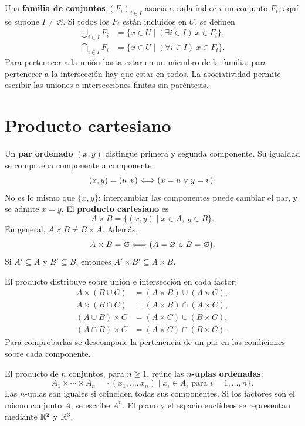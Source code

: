 Una \textbf{familia de conjuntos} $(F_i)_{i\in I}$ asocia a cada índice
$i$ un conjunto $F_i$; aquí se supone $I\ne\varnothing$.
Si todos los $F_i$ están incluidos en $U$, se definen
\begin{align*}
 \bigcup_{i\in I}F_i
   &=\{x\in U\mid(\exists i\in I)\ x\in F_i\},\\
 \bigcap_{i\in I}F_i
   &=\{x\in U\mid(\forall i\in I)\ x\in F_i\}.
\end{align*}
Para pertenecer a la unión basta estar en un miembro de la familia;
para pertenecer a la intersección hay que estar en todos.
La asociatividad permite escribir las uniones e intersecciones finitas
sin paréntesis.

\newpage
\section{Producto cartesiano}
\label{sec:producto-cartesiano}

Un \textbf{par ordenado} $(x,y)$ distingue primera y segunda componente.
Su igualdad se comprueba componente a componente:
\[
 (x,y)=(u,v)\Longleftrightarrow(x=u\ \text{y}\ y=v).
\]
No es lo mismo que $\{x,y\}$: intercambiar las componentes puede cambiar
el par, y se admite $x=y$.
El \textbf{producto cartesiano} es
\[
 A\times B=\{(x,y)\mid x\in A,\ y\in B\}.
\]
En general, $A\times B\ne B\times A$. Además,
\[
 A\times B=\varnothing\Longleftrightarrow
   (A=\varnothing\ \text{o}\ B=\varnothing).
\]
Si $A'\subseteq A$ y $B'\subseteq B$, entonces
$A'\times B'\subseteq A\times B$.

El producto distribuye sobre unión e intersección en cada factor:
\begin{align*}
 A\times(B\cup C)&=(A\times B)\cup(A\times C),\\
 A\times(B\cap C)&=(A\times B)\cap(A\times C),\\
 (A\cup B)\times C&=(A\times C)\cup(B\times C),\\
 (A\cap B)\times C&=(A\times C)\cap(B\times C).
\end{align*}
Para comprobarlas se descompone la pertenencia de un par en las
condiciones sobre cada componente.

El producto de $n$ conjuntos, para $n\ge1$, reúne las
\textbf{$n$-uplas ordenadas}:
\[
 A_1\times\cdots\times A_n
 =\{(x_1,\ldots,x_n)\mid x_i\in A_i\text{ para }i=1,\ldots,n\}.
\]
Las $n$-uplas son iguales si coinciden todas sus componentes.
Si los factores son el mismo conjunto $A$, se escribe $A^n$.
El plano y el espacio euclídeos se representan mediante $\mathbb{R}^2$ y $\mathbb{R}^3$.

